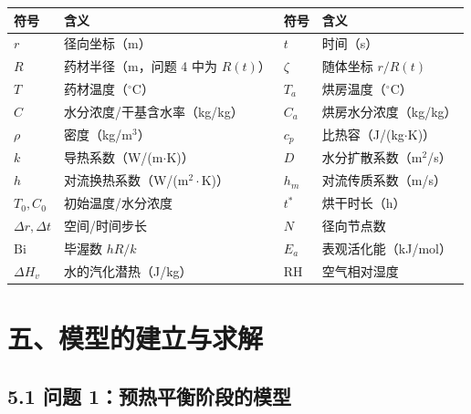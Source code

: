 \documentclass[12pt,a4paper]{ctexart}
\begin{document}
\begin{center}
{\begin{tabular}{llll}
\toprule
符号 & 含义 & 符号 & 含义 \\
\midrule
$r$ & 径向坐标（m） & $t$ & 时间（s） \\
$R$ & 药材半径（m，问题 4 中为 $R(t)$） & $\zeta$ & 随体坐标 $r/R(t)$ \\
$T$ & 药材温度（$^\circ$C） & $T_a$ & 烘房温度（$^\circ$C） \\
$C$ & 水分浓度/干基含水率（kg/kg） & $C_a$ & 烘房水分浓度（kg/kg） \\
$\rho$ & 密度（kg/m$^3$） & $c_p$ & 比热容（J/(kg$\cdot$K)） \\
$k$ & 导热系数（W/(m$\cdot$K)） & $D$ & 水分扩散系数（m$^2$/s） \\
$h$ & 对流换热系数（W/(m$^2\!\cdot$K)） & $h_m$ & 对流传质系数（m/s） \\
$T_0,C_0$ & 初始温度/水分浓度 & $t^*$ & 烘干时长（h） \\
$\Delta r,\Delta t$ & 空间/时间步长 & $N$ & 径向节点数 \\
$\mathrm{Bi}$ & 毕渥数 $hR/k$ & $E_a$ & 表观活化能（kJ/mol） \\
$\Delta H_v$ & 水的汽化潜热（J/kg） & $\mathrm{RH}$ & 空气相对湿度 \\
\bottomrule
\end{tabular}}
\end{center}

\section{五、模型的建立与求解}

\subsection{5.1 问题 1：预热平衡阶段的模型}
\end{document}
